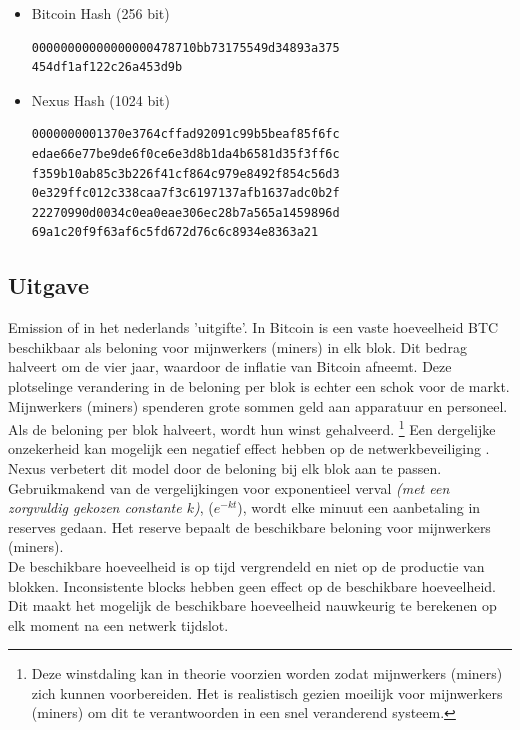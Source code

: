 \documentclass[11pt]{article}
\begin{document}
\begin{itemize}
\item Bitcoin Hash (256 bit)
\begin{lstlisting}
00000000000000000478710bb73175549d34893a375
454df1af122c26a453d9b
\end{lstlisting}

\item Nexus Hash (1024 bit)

\begin{lstlisting}
0000000001370e3764cffad92091c99b5beaf85f6fc
edae66e77be9de6f0ce6e3d8b1da4b6581d35f3ff6c
f359b10ab85c3b226f41cf864c979e8492f854c56d3
0e329ffc012c338caa7f3c6197137afb1637adc0b2f
22270990d0034c0ea0eae306ec28b7a565a1459896d
69a1c20f9f63af6c5fd672d76c6c8934e8363a21
\end{lstlisting}
\end{itemize}


\pagebreak
\subsection{Uitgave}

Emission of in het nederlands 'uitgifte'. In Bitcoin is een vaste hoeveelheid BTC beschikbaar als beloning voor mijnwerkers (miners) in elk blok. Dit bedrag halveert om de vier jaar, waardoor de inflatie van Bitcoin afneemt. Deze plotselinge verandering in de beloning per blok is echter een schok voor de markt. Mijnwerkers (miners) spenderen grote sommen geld aan apparatuur en personeel. Als de beloning per blok halveert, wordt hun winst gehalveerd.
\footnote{Deze winstdaling kan in theorie voorzien worden zodat mijnwerkers (miners) zich kunnen voorbereiden. Het is realistisch gezien moeilijk voor mijnwerkers (miners) om dit te verantwoorden in een snel veranderend systeem.}
Een dergelijke onzekerheid kan mogelijk een negatief effect hebben op de netwerkbeveiliging \cite{cdhalving}.
\noindent Nexus verbetert dit model door de beloning bij elk blok aan te passen. Gebruikmakend van de vergelijkingen voor exponentieel verval \textit{(met een zorgvuldig gekozen constante $k$)}, ($e^{-kt}$), 
wordt elke minuut een aanbetaling in reserves gedaan. Het reserve bepaalt de beschikbare beloning voor mijnwerkers (miners).\\ 

\noindent De beschikbare hoeveelheid is op tijd vergrendeld en niet op de productie van blokken. Inconsistente blocks hebben geen effect op de beschikbare hoeveelheid. Dit maakt het mogelijk de beschikbare hoeveelheid nauwkeurig te berekenen op elk moment na een netwerk tijdslot.
\end{document}
